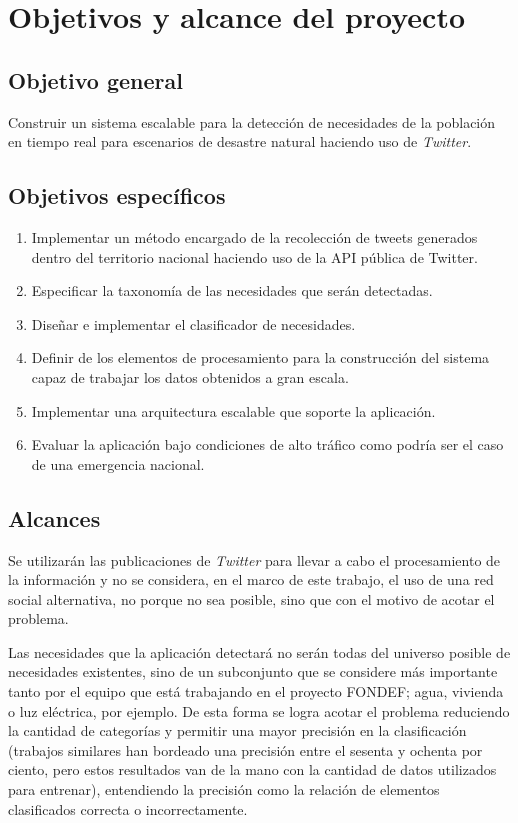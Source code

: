\section{Objetivos y alcance del proyecto}
\label{intro:objetivos}

\subsection{Objetivo general}
	Construir un sistema escalable para la detección de necesidades de la población en tiempo real para escenarios de desastre natural haciendo uso de \textit{Twitter}.

\subsection{Objetivos específicos}
\begin{enumerate}
\item	Implementar un método encargado de la recolección de tweets generados dentro del territorio nacional haciendo uso de la API pública de Twitter.
\item	Especificar la taxonomía de las necesidades que serán detectadas.
\item	Diseñar e implementar el clasificador de necesidades.
\item	Definir de los elementos de procesamiento para la construcción del sistema capaz de trabajar los datos obtenidos a gran escala.
\item	Implementar una arquitectura escalable que soporte la aplicación.
\item	Evaluar la aplicación bajo condiciones de alto tráfico como podría ser el caso de una emergencia nacional.
\end{enumerate}

\subsection{Alcances}
\label{subsec:alcances}

Se utilizarán las publicaciones de \textit{Twitter} para llevar a cabo el procesamiento de la información y no se considera, en el marco de este trabajo, el uso de una red social alternativa, no porque no sea posible, sino que con el motivo de acotar el problema.

Las necesidades que la aplicación detectará no serán todas del universo posible de necesidades existentes, sino de un subconjunto que se considere más importante tanto por el equipo que está trabajando en el proyecto FONDEF; agua, vivienda o luz eléctrica, por ejemplo. De esta forma se logra acotar el problema reduciendo la cantidad de categorías y permitir una mayor precisión en la clasificación (trabajos similares han bordeado una precisión entre el sesenta y ochenta por ciento, pero estos resultados van de la mano con la cantidad de datos utilizados para entrenar), entendiendo la precisión como la relación de elementos clasificados correcta o incorrectamente.

